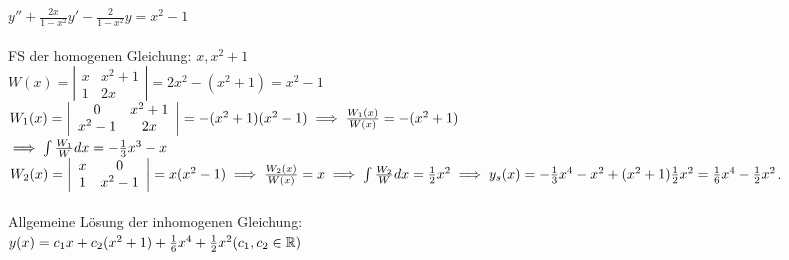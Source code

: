 \documentclass{article}
\begin{document}
\begin{beispiel}
$y''+\frac{2x}{1-x^2}y'-\frac{2}{1-x^2}y = x^2-1$ \\\\
FS der homogenen Gleichung: $x, x^2+1$ \\
$W(x) = \left|\begin{array}{cc}x & x^2+1 \\ 1 & 2x\end{array}\right| = 2x^2 - (x^2+1) = x^2 - 1$ \\
$W_1(x) = \left|\begin{array}{cc}0 & x^2+1 \\ x^2-1 & 2x\end{array}\right| = -(x^2+1)(x^2-1) \implies \frac{W_1(x)}{W(x)} = -(x^2+1)$ \\
$\implies \int\frac{W_1}{W}dx = -\frac{1}{3}x^3 - x$ \\
$W_2(x) = \left|\begin{array}{cc}x & 0 \\ 1 & x^2-1\end{array}\right| = x(x^2-1) \implies \frac{W_2(x)}{W(x)} = x \implies \int\frac{W_2}{W}dx = \frac{1}{2}x^2 \\
\implies y_s(x) = -\frac{1}{3}x^4 - x^2 + (x^2+1)\frac{1}{2}x^2 = \frac{1}{6}x^4 - \frac{1}{2}x^2$. \\\\
Allgemeine Lösung der inhomogenen Gleichung: \\
$y(x) = c_1x + c_2(x^2+1)+\frac{1}{6}x^4+\frac{1}{2}x^2 (c_1,c_2 \in \mathbb{R})$
\end{beispiel}
\end{document}
